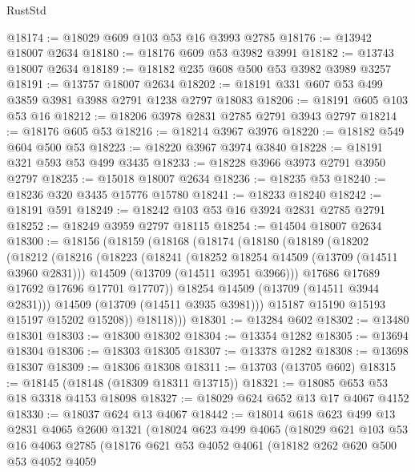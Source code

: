 \begin{lexlean}{RustStd}
\begin{coremodule}
@18174 := @18029 @609 @103 @53 @16 @3993 @2785
@18176 := @13942 @18007 @2634
@18180 := @18176 @609 @53 @3982 @3991
@18182 := @13743 @18007 @2634
@18189 := @18182 @235 @608 @500 @53 @3982 @3989 @3257
@18191 := @13757 @18007 @2634
@18202 := @18191 @331 @607 @53 @499 @3859 @3981 @3988 @2791 @1238 @2797 @18083
@18206 := @18191 @605 @103 @53 @16
@18212 := @18206 @3978 @2831 @2785 @2791 @3943 @2797
@18214 := @18176 @605 @53
@18216 := @18214 @3967 @3976
@18220 := @18182 @549 @604 @500 @53
@18223 := @18220 @3967 @3974 @3840
@18228 := @18191 @321 @593 @53 @499 @3435
@18233 := @18228 @3966 @3973 @2791 @3950 @2797
@18235 := @15018 @18007 @2634
@18236 := @18235 @53
@18240 := @18236 @320 @3435 @15776 @15780
@18241 := @18233 @18240
@18242 := @18191 @591
@18249 := @18242 @103 @53 @16 @3924 @2831 @2785 @2791
@18252 := @18249 @3959 @2797 @18115
@18254 := @14504 @18007 @2634
@18300 := @18156
    (@18159
      (@18168
        (@18174
          (@18180
            (@18189
              (@18202
                (@18212
                  (@18216
                    (@18223
                      (@18241
                        (@18252 @18254 @14509 (@13709 (@14511 @3960 @2831)))
                        @14509
                        (@13709 (@14511 @3951 @3966)))
                      @17686
                      @17689
                      @17692
                      @17696
                      @17701
                      @17707))
                  @18254
                  @14509
                  (@13709 (@14511 @3944 @2831)))
                @14509
                (@13709 (@14511 @3935 @3981)))
              @15187
              @15190
              @15193
              @15197
              @15202
              @15208))
          @18118)))
@18301 := @13284 @602
@18302 := @13480 @18301
@18303 := @18300 @18302
@18304 := @13354 @1282
@18305 := @13694 @18304
@18306 := @18303 @18305
@18307 := @13378 @1282
@18308 := @13698 @18307
@18309 := @18306 @18308
@18311 := @13703 (@13705 @602)
@18315 := @18145 (@18148 (@18309 @18311 @13715))
@18321 := @18085 @653 @53 @18 @3318 @4153 @18098
@18327 := @18029 @624 @652 @13 @17 @4067 @4152
@18330 := @18037 @624 @13 @4067
@18442 := @18014
    @618
    @623
    @499
    @13
    @2831
    @4065
    @2600
    @1321
    (@18024
      @623
      @499
      @4065
      (@18029
        @621
        @103
        @53
        @16
        @4063
        @2785
        (@18176
          @621
          @53
          @4052
          @4061
          (@18182
            @262
            @620
            @500
            @53
            @4052
            @4059

\end{coremodule}
\end{lexlean}
